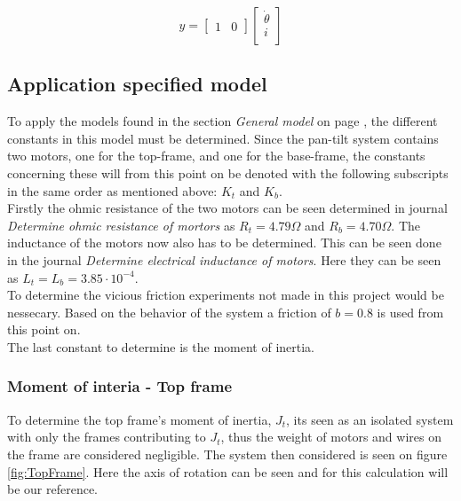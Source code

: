 \documentclass[../../main]{subfiles}
\begin{document}
\begin{equation}
      \label{equ:model_ss_2}
      y =
    \begin{bmatrix}
        1 & 0
    \end{bmatrix}
    \begin{bmatrix}
        \dot \theta\\
        i\\
    \end{bmatrix}
\end{equation}




\subsection{Application specified model}

To apply the models found in the section \textit{General model} on page \pageref{sec:General_model}, the different constants in this model must be determined. Since the pan-tilt system contains two motors, one for the top-frame, and one for the base-frame, the constants concerning these will from this point on be denoted with the following subscripts in the same order as mentioned above: $K_t$ and $K_{b}$.\\
Firstly the ohmic resistance of the two motors can be seen determined in journal \textit{Determine ohmic resistance of mortors} as $R_t = 4.79 \Omega$ and $R_b = 4.70 \Omega$. The inductance of the motors now also has to be determined. This can be seen done in the journal \textit{Determine electrical inductance of motors}. Here they can be seen as $L_t = L_b = 3.85\cdot 10^{-4}$.\\

To determine the vicious friction experiments not made in this project would be nessecary. Based on the behavior of the system a friction of $b = 0.8$ is used from this point on.\\
The last constant to determine is the moment of inertia.

\subsubsection{Moment of interia - Top frame}
\label{ch:Top_frame}
To determine the top frame's moment of inertia, $J_{t}$, its seen as an isolated system with only the frames contributing to $J_{t}$, thus the weight of motors and wires on the frame are considered negligible. The system then considered is seen on figure \ref{fig:TopFrame}. Here the axis of rotation can be seen and for this calculation will be our reference.\\
\end{document}

